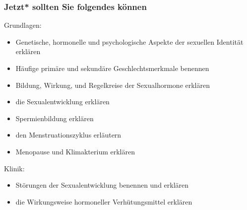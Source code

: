 \documentclass{beamer}
\begin{document}


\begin{frame}

 \frametitle{Jetzt* sollten Sie folgendes können}



\begin{block}{Grundlagen:}
\begin{itemize}
\item
 Genetische, hormonelle und psychologische Aspekte der sexuellen Identität erklären
\item
 Häufige primäre und sekundäre Geschlechtsmerkmale benennen
\item
 Bildung, Wirkung, und Regelkreise der Sexualhormone erklären
\item
 die Sexualentwicklung erklären
\item
 Spermienbildung erklären
\item
 den Menstruationszyklus erläutern
\item
Menopause und Klimakterium erklären



\end{itemize}

\end{block}

\begin{block}{Klinik:}
\begin{itemize}
\item
Störungen der Sexualentwicklung benennen und erklären
\item
die Wirkungsweise hormoneller Verhütungsmittel erklären


\end{itemize}

\end{block}


\end{frame}




\end{document}
